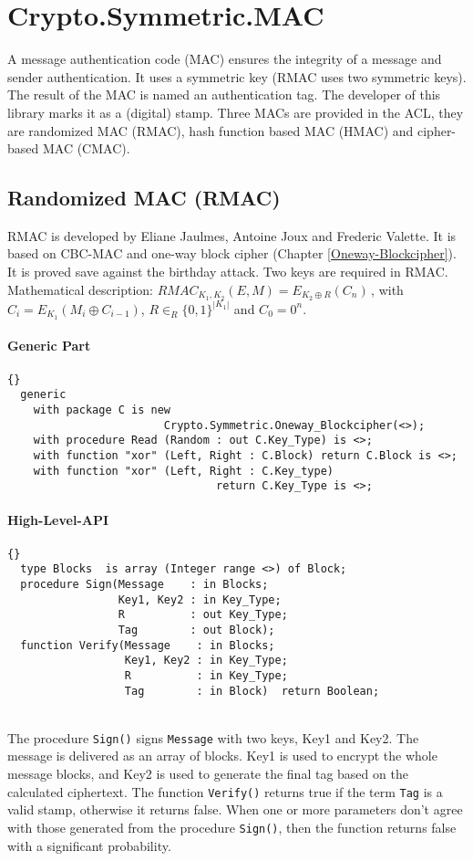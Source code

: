 \chapter{Crypto.Symmetric.MAC}\label{MAC}
A message authentication code (MAC) ensures the integrity of a message and sender authentication. It uses a symmetric key (RMAC uses two symmetric keys). The result of the MAC is named an authentication tag. The developer of this library marks it as a (digital) stamp. Three MACs are provided in the ACL, they are randomized MAC (RMAC), hash function based MAC (HMAC) and cipher-based MAC (CMAC).
\section{Randomized MAC (RMAC)}
RMAC is developed by Eliane Jaulmes, Antoine Joux and Frederic Valette. It is based on CBC-MAC and one-way block cipher (Chapter \ref{Oneway-Blockcipher}). It is proved save against the birthday attack. Two keys are required in RMAC.\\
Mathematical description: $RMAC_{K_1,K_2}(E,M)=E_{K_2\oplus R}(C_n)$\,, with $C_i=E_{K_1}(M_i\oplus C_{i-1})$, $R\in_R\{0,1\}^{|K_1|}$ and $C_0=0^n$.
\subsubsection*{Generic Part}
\begin{lstlisting}{}
  generic
    with package C is new 
    					Crypto.Symmetric.Oneway_Blockcipher(<>);
    with procedure Read (Random : out C.Key_Type) is <>;
    with function "xor" (Left, Right : C.Block) return C.Block is <>;
    with function "xor" (Left, Right : C.Key_type) 
     							return C.Key_Type is <>;
\end{lstlisting}
\newpage
\subsubsection*{High-Level-API}
\begin{lstlisting}{}
  type Blocks  is array (Integer range <>) of Block;
  procedure Sign(Message    : in Blocks;
                 Key1, Key2 : in Key_Type;
                 R          : out Key_Type;
                 Tag        : out Block);
  function Verify(Message    : in Blocks;
                  Key1, Key2 : in Key_Type;
                  R          : in Key_Type;
                  Tag        : in Block)  return Boolean;
\end{lstlisting}\\
The procedure \texttt{Sign()} signs \texttt{Message} with two keys, Key1 and Key2. The message is delivered as an array of blocks. Key1 is used to encrypt the whole message blocks, and Key2 is used to generate the final tag based on the calculated ciphertext.
The function \texttt{Verify()} returns true if the term \texttt{Tag} is a valid stamp, otherwise it returns false. When one or more parameters don't agree with those generated from the procedure \texttt{Sign()}, then the function returns false with a significant probability.\\
